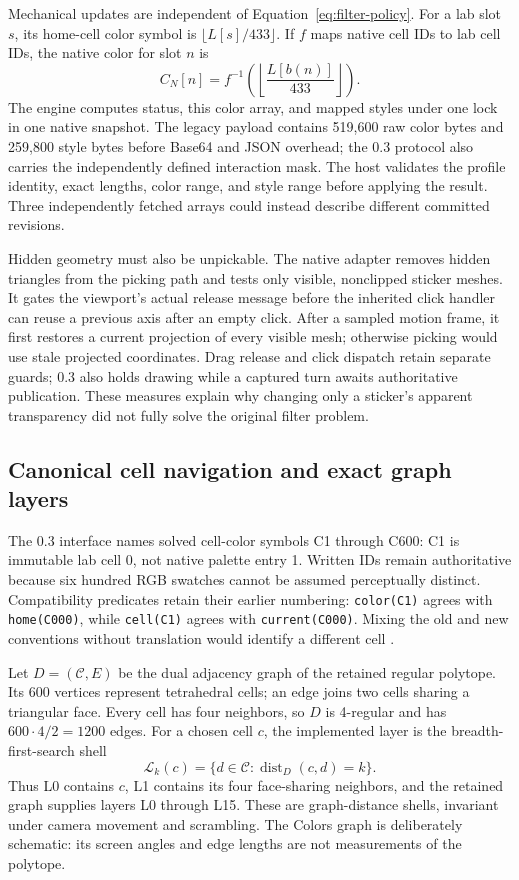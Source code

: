 \documentclass[a4paper,11pt]{article}
\begin{document}
Mechanical updates are independent of Equation~\eqref{eq:filter-policy}. For a lab slot \(s\), its home-cell color symbol is \(\lfloor L[s]/433\rfloor\). If \(f\) maps native cell IDs to lab cell IDs, the native color for slot \(n\) is
\begin{equation}
C_N[n]=f^{-1}\!\left(\left\lfloor\frac{L[b(n)]}{433}\right\rfloor\right).
\label{eq:native-colors}
\end{equation}
The engine computes status, this color array, and mapped styles under one lock in one native snapshot. The legacy payload contains 519,600 raw color bytes and 259,800 style bytes before Base64 and JSON overhead; the 0.3 protocol also carries the independently defined interaction mask. The host validates the profile identity, exact lengths, color range, and style range before applying the result. Three independently fetched arrays could instead describe different committed revisions.

Hidden geometry must also be unpickable. The native adapter removes hidden triangles from the picking path and tests only visible, nonclipped sticker meshes. It gates the viewport's actual release message before the inherited click handler can reuse a previous axis after an empty click. After a sampled motion frame, it first restores a current projection of every visible mesh; otherwise picking would use stale projected coordinates. Drag release and click dispatch retain separate guards; 0.3 also holds drawing while a captured turn awaits authoritative publication. These measures explain why changing only a sticker's apparent transparency did not fully solve the original filter problem.


\subsection{Canonical cell navigation and exact graph layers}

The 0.3 interface names solved cell-color symbols C1 through C600: C1 is immutable lab cell 0, not native palette entry 1. Written IDs remain authoritative because six hundred RGB swatches cannot be assumed perceptually distinct. Compatibility predicates retain their earlier numbering: \texttt{color(C1)} agrees with \texttt{home(C000)}, while \texttt{cell(C1)} agrees with \texttt{current(C000)}. Mixing the old and new conventions without translation would identify a different cell \cite{structure03}.

Let \(D=(\mathcal C,E)\) be the dual adjacency graph of the retained regular polytope. Its 600 vertices represent tetrahedral cells; an edge joins two cells sharing a triangular face. Every cell has four neighbors, so \(D\) is 4-regular and has \(600\cdot4/2=1200\) edges. For a chosen cell \(c\), the implemented layer is the breadth-first-search shell
\[
\mathcal L_k(c)=\{d\in\mathcal C:\operatorname{dist}_D(c,d)=k\}.
\]
Thus L0 contains \(c\), L1 contains its four face-sharing neighbors, and the retained graph supplies layers L0 through L15. These are graph-distance shells, invariant under camera movement and scrambling. The Colors graph is deliberately schematic: its screen angles and edge lengths are not measurements of the polytope.
\end{document}
